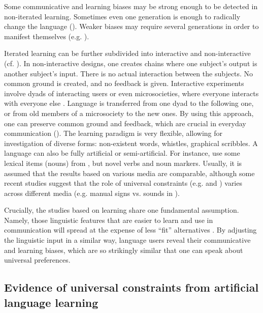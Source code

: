 \documentclass[output=paper]{langsci/langscibook}
\begin{document}
Some communicative and learning biases may be strong enough to be detected in non-iterated learning. Sometimes even one generation is enough to radically change the language (\citealt{Hudson2009_ChangeLearn}). Weaker biases may require several generations in order to manifest themselves (e.g. \citealt{RealiGriffiths2009,SmithWonnacott2010}). 

Iterated learning can be further subdivided into interactive and non-inter\-ac\-tive (cf. \citealt{Tamariz2017}). In non-interactive designs, one creates  chains where one subject’s output is another subject’s input. There is no actual interaction between the subjects. No common ground is created, and no feedback is given. Interactive experiments involve dyads of interacting users or even microsocieties, where everyone interacts with everyone else \citep{Tamariz2017}. Language is transferred from one dyad to the following one, or from old members of a microsociety to the new ones. By using this approach, one can preserve common ground and feedback, which are crucial in everyday communication (\citealt{CaldwellSmith2012}). 
\newpage
The  learning paradigm is very flexible, allowing for investigation of diverse forms: non-existent words, whistles, graphical scribbles. A language can also be fully artificial or semi-artificial. For instance, \citet{SmithWonnacott2010} use some lexical items (nouns) from , but novel verbs and  noun markers. Usually, it is assumed that the results based on various media are comparable, although some recent studies suggest that the role of universal constraints (e.g.  and ) varies across different media (e.g. manual signs vs. sounds in \citealt{LittleEtAl2017}).

Crucially, the studies based on  learning share one fundamental assumption. Namely, those linguistic features that are easier to learn and use in communication will spread at the expense of less “fit” alternatives \citep{SmithEtAl2017}. By adjusting the linguistic input in a similar way, language users reveal their communicative and learning biases, which are so strikingly similar that one can speak about universal preferences. 

\subsection{Evidence of universal constraints from artificial language learning}
\end{document}
